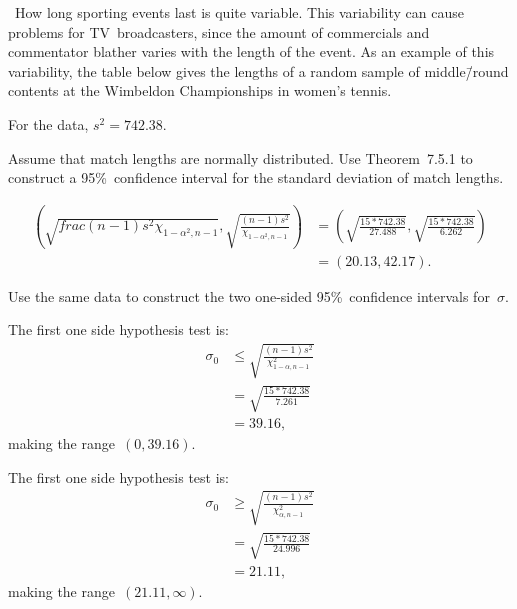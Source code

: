 \begin{problem}
  ~How long sporting events last is quite variable.  This variability can cause problems for TV~broadcasters, since the amount of commercials and commentator blather varies with the length of the event.  As an example of this variability, the table below gives the lengths of a random sample of middle\=/round contents at the Wimbeldon Championships in women's tennis.
\end{problem}

For the data, ${s^2 = 742.38}$.

\begin{subproblem}
  Assume that match lengths are normally distributed. Use Theorem~7.5.1 to construct a 95\%~confidence interval for the standard deviation of match lengths.
\end{subproblem}

\begin{align}
  \left(\sqrt{frac{(n-1)s^2}{\chi_{1-\alpha^2,n-1}}},\sqrt{\frac{(n-1)s^2}{\chi_{1-\alpha^2,n-1}}}\right) &= \left(\sqrt{\frac{15 * 742.38}{27.488}}, \sqrt{\frac{15 * 742.38}{6.262}}\right) \\
                                                                                                          &= \left(20.13,42.17\right)\text{.}
\end{align}

\begin{subproblem}
  Use the same data to construct the two one-sided 95\%~confidence intervals for~$\sigma$.
\end{subproblem}

The first one side hypothesis test is:
\begin{align}
  \sigma_0 &\leq \sqrt{\frac{(n-1)  s^2}{\chi_{1- \alpha,n-1}^{2}}} \\
           &= \sqrt{\frac{15 * 742.38}{7.261}} \\
           &= 39.16 \text{,}
\end{align}
\noindent
making the range~${(0, 39.16)}$.

The first one side hypothesis test is:
\begin{align}
  \sigma_0 &\geq \sqrt{\frac{(n-1)  s^2}{\chi_{\alpha,n-1}^{2}}} \\
           &= \sqrt{\frac{15 * 742.38}{24.996}} \\
           &= 21.11 \text{,}
\end{align}
\noindent
making the range~${(21.11,\infty)}$.
